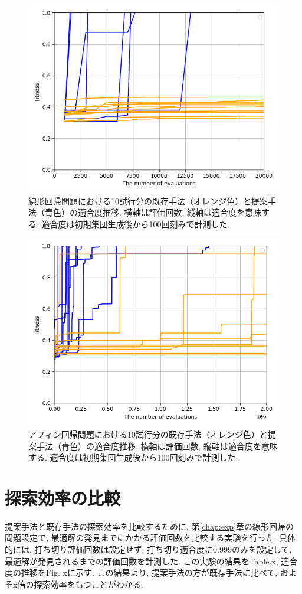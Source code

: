 \documentclass[11pt,oneside,openany,report]{jsbook}
\begin{document}
\begin{figure}[tbp]
  \centering
  \includegraphics[width=12cm]{exp/linear_regression_progress.png}
  \caption{線形回帰問題における10試行分の既存手法（オレンジ色）と提案手法（青色）の適合度推移. 横軸は評価回数, 縦軸は適合度を意味する. 適合度は初期集団生成後から100回刻みで計測した.}
  \label{fig:exp:result:affine}
\end{figure}

\begin{figure}[tbp]
  \centering
  \includegraphics[width=12cm]{exp/affine_regression_progress.png}
  \caption{アフィン回帰問題における10試行分の既存手法（オレンジ色）と提案手法（青色）の適合度推移. 横軸は評価回数, 縦軸は適合度を意味する. 適合度は初期集団生成後から100回刻みで計測した.}
  \label{fig:exp:result:linear}
\end{figure}

\section{探索効率の比較}
提案手法と既存手法の探索効率を比較するために, 第\ref{chap:exp}章の線形回帰の問題設定で, 最適解の発見までにかかる評価回数を比較する実験を行った. 具体的には, 打ち切り評価回数は設定せず, 打ち切り適合度に0.999のみを設定して, 最適解が発見されるまでの評価回数を計測した. この実験の結果をTable.x, 適合度の推移をFig. xに示す. この結果より, 提案手法の方が既存手法に比べて, およそx倍の探索効率をもつことがわかる.
\end{document}
